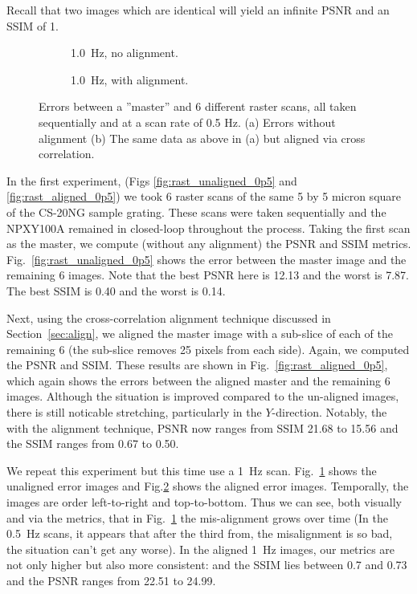 \documentclass[twocolumn,twoside]{IEEEtran/IEEEtran}
\begin{document}
Recall that two images which are identical will yield an infinite PSNR and an
SSIM of 1.

\begin{figure}[t!]
  \begin{subfigure}{.48\textwidth}
    
    \caption{1.0~Hz, no alignment.}
    \label{fig:rast_unaligned_1}
  \end{subfigure}
  \hfill
  \begin{subfigure}{.48\textwidth}
    
    \caption{1.0~Hz, with alignment.}
    \label{fig:rast_aligned_1}
  \end{subfigure}
% 
  \caption{Errors between a ''master'' and 6 different raster scans, all taken
    sequentially and at a scan rate of 0.5 Hz. (a) Errors without alignment (b)
    The same data as above in (a) but aligned via cross correlation.}
  \label{fig:baseline_errors}
\end{figure}

In the first experiment, (Figs \ref{fig:rast_unaligned_0p5} and
\ref{fig:rast_aligned_0p5}) we took 6 raster scans of the same 5 by 5 micron
square of the CS-20NG sample grating. These scans were taken sequentially and
the NPXY100A remained in closed-loop throughout the process. Taking the first
scan as the master, we compute (without any alignment) the PSNR and SSIM
metrics. Fig.~\ref{fig:rast_unaligned_0p5} shows the error between the master
image and the remaining 6 images. Note that the best PSNR here is 12.13 and the
worst is 7.87. The best SSIM is 0.40 and the worst is 0.14.

Next, using the cross-correlation alignment technique discussed in
Section~\ref{sec:align}, we aligned the master image with a sub-slice of each of
the remaining 6 (the sub-slice removes 25 pixels from each side). Again, we
computed the PSNR and SSIM. These results are shown in
Fig.~\ref{fig:rast_aligned_0p5}, which again shows the errors between the
aligned master and the remaining 6 images. Although the situation is improved
compared to the un-aligned images, there is still noticable stretching,
particularly in the $Y$-direction. Notably, the with the alignment technique,
PSNR now ranges from SSIM 21.68 to 15.56 and the SSIM ranges from 0.67 to 0.50.


We repeat this experiment but this time use a 1~Hz scan.
Fig.~\ref{fig:rast_unaligned_1} shows the unaligned error images and
Fig.\ref{fig:rast_aligned_1} shows the aligned error images. Temporally, the
images are order left-to-right and top-to-bottom. Thus we can see, both visually
and via the metrics, that in Fig.~\ref{fig:rast_unaligned_1} the mis-alignment
grows over time (In the 0.5~Hz scans, it appears that after the third from, the
misalignment is so bad, the situation can't get any worse). In the aligned 1~Hz
images, our metrics are not only higher but also more consistent: and the SSIM
lies between 0.7 and 0.73 and the PSNR ranges from 22.51 to 24.99.
\end{document}

